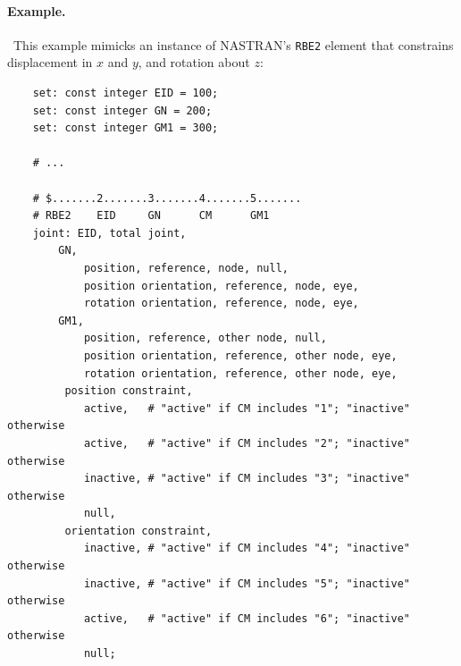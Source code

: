 \paragraph{Example.} \
This example mimicks an instance of NASTRAN's \texttt{RBE2} element
that constrains displacement in $x$ and $y$, and rotation about $z$:
\begin{verbatim}
    set: const integer EID = 100;
    set: const integer GN = 200;
    set: const integer GM1 = 300;

    # ...

    # $.......2.......3.......4.......5.......
    # RBE2    EID     GN      CM      GM1
    joint: EID, total joint,
        GN,
            position, reference, node, null,
            position orientation, reference, node, eye,
            rotation orientation, reference, node, eye,
        GM1,
            position, reference, other node, null,
            position orientation, reference, other node, eye,
            rotation orientation, reference, other node, eye,
         position constraint,
            active,   # "active" if CM includes "1"; "inactive" otherwise
            active,   # "active" if CM includes "2"; "inactive" otherwise
            inactive, # "active" if CM includes "3"; "inactive" otherwise
            null,
         orientation constraint,
            inactive, # "active" if CM includes "4"; "inactive" otherwise
            inactive, # "active" if CM includes "5"; "inactive" otherwise
            active,   # "active" if CM includes "6"; "inactive" otherwise
            null;
\end{verbatim}



